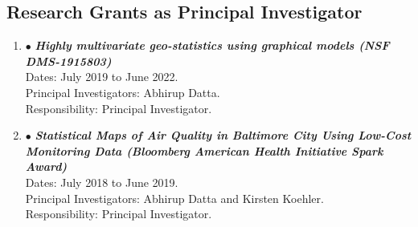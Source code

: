 \documentclass[12pt]{article}
\newcommand{\dn}[1]{{\color{black} {#1}}}
\newcommand{\mydot}[1]{\begin{enumerate}[label=$\circ$,leftmargin=\parindent]\setlength{\itemsep}{#1}}
\newcommand{\ee}{\end{enumerate}}
\newcommand{\mylift}[1]{\vspace*{#1}}
\begin{document}
%
%
%
%
%
%
%
%

\mylift{-1.em}
\subsection*{Research Grants as Principal  Investigator}  

\mydot{0.3em}

\item[$\bullet$]
{\it \textbf{Highly multivariate geo-statistics using graphical models (NSF DMS-1915803)}}\\[0.0em]
\dn{Dates:} July 2019 to June 2022.\\
\dn{Principal Investigators:} Abhirup Datta.\\
\dn{Responsibility:} Principal Investigator.

\item[$\bullet$]
{\it \textbf{Statistical Maps of Air Quality in Baltimore City Using Low-Cost Monitoring Data (Bloomberg American Health Initiative Spark Award)}}\\[0.0em]
\dn{Dates:} July 2018 to June 2019.\\
\dn{Principal Investigators:} Abhirup Datta and Kirsten Koehler.\\
\dn{Responsibility:} Principal Investigator.

\ee
\end{document}
